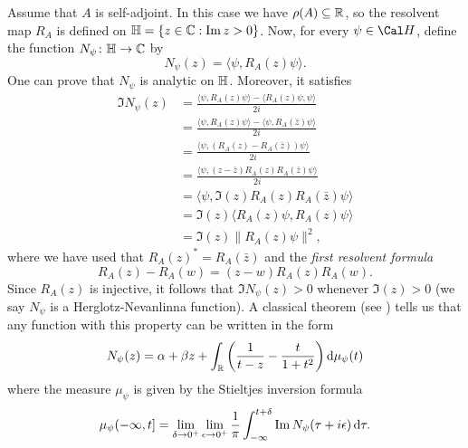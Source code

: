 Assume that \(A\) is self-adjoint. In this case we have
\(\rho(A)\subseteq\mathbb{R}\), so the resolvent map \(R_A\) is defined on
\(\mathbb{H}=\{z\in\mathbb{C} : \operatorname{Im} z > 0\}\).
Now, for every \(\psi\in\Cal H\), define the function
\(N_\psi\colon\mathbb{H}\to\mathbb{C}\) by
\begin{equation}
  N_\psi(z) = \langle \psi,R_A(z)\psi\rangle.
\end{equation}
One can prove that \(N_\psi\) is analytic on \(\mathbb{H}\). Moreover, it
satisfies
\begin{align}
  \Im N_\psi(z)
  &= \frac{
    \langle\psi,R_A(z)\psi\rangle
    -
    \langle R_A(z)\psi,\psi\rangle
  }{2i} \\
  &= \frac{
    \langle\psi,R_A(z)\psi\rangle
    -
    \langle\psi,R_A(\bar z)\psi\rangle
  }{2i} \\
  &= \frac{ \langle\psi,(R_A(z)-R_A(\bar z))\psi\rangle }{2i} \\
  &= \frac{ \langle\psi,(z-\bar z)R_A(z)R_A(\bar z)\psi\rangle }{2i} \\
  &= \langle\psi,\Im(z)R_A(z)R_A(\bar z)\psi\rangle \\
  &= \Im(z)\langle R_A(z)\psi,R_A(z)\psi\rangle \\
  &= \Im(z)\|R_A(z)\psi\|^{2}
,\end{align}
where we have used that \(R_A(z)^{*}=R_A(\bar z)\) and
the \emph{first resolvent formula}
\begin{equation}
  R_A(z)-R_A(w)=(z-w)R_A(z)R_A(w)
.\end{equation}
Since \(R_A(z)\) is injective, it follows that \(\Im N_\psi(z)>0\)
whenever \(\Im(z)>0\) (we say \(N_\psi\) is a Herglotz-Nevanlinna
function).
A classical theorem
(see \cite[\S69, Thm 2]{akhiezer1961operators})
tells us that any function with this property can
be written in the form
\begin{equation}
  \label{eq:nevanlinna}
  N_\psi(z)
  = \alpha + \beta z +
  \int_{\mathbb{R}}^{} 
  \left(
    \frac{1}{t - z}
    -
    \frac{t}{1 + t^{2}}
  \right)
    \mathop{}\!\mathrm{d}\mu_\psi(t)
\end{equation}
where the measure \(\mu_\psi\) is given
by the Stieltjes inversion formula
\begin{equation}
  \label{eq:inversion}
  \mu_\psi(-\infty,t]
  =
  \lim_{\delta\to 0^{+}}
  \lim_{\epsilon\to 0^{+}}
  \frac{1}{\pi}
  \int_{-\infty}^{t+\delta}\operatorname{Im} N_\psi(\tau+i\epsilon)\mathop{}\!\mathrm{d} \tau
.\end{equation}

